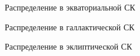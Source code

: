 \documentclass[14pt]{article} %
\begin{document}
\begin{figure}[h!]
\caption{Распределение в экваториальной СК}
\label{img:hiptgasra}
\end{figure}
\begin{figure}[h!]
\caption{Распределение в галлактической СК}
\label{img:hiptgasl}
\end{figure}
\begin{figure}[h!]
\caption{Распределение в эклиптической СК}
\label{img:hiptgaslo}
\end{figure}
\end{document}

